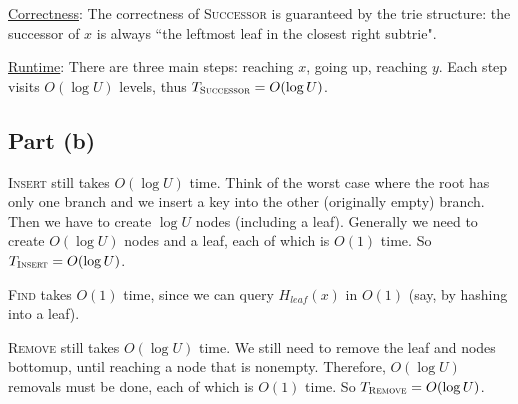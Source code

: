 \documentclass{article}
\begin{document}
\noindent\underline{Correctness}: The correctness of \textsc{Successor} is guaranteed by the trie structure: the successor of $x$ is always ``the leftmost leaf in the closest right subtrie".

\noindent\underline{Runtime}: There are three main steps: reaching $x$, going up, reaching $y$. Each step visits $O(\log U)$ levels, thus $T_{\textsc{Successor}}=O(\log U)$.

\subsection{Part (b)}
\textsc{Insert} still takes $O(\log U)$ time. Think of the worst case where the root has only one branch and we insert a key into the other (originally empty) branch. Then we have to create $\log U$ nodes (including a leaf). Generally we need to create $O(\log U)$ nodes and a leaf, each of which is $O(1)$ time. So $T_{\textsc{Insert}}=O(\log U)$.

\textsc{Find} takes $O(1)$ time, since we can query $H_{leaf}(x)$ in $O(1)$ (say, by hashing into a leaf).

\textsc{Remove} still takes $O(\log U)$ time. We still need to remove the leaf and nodes bottomup, until reaching a node that is nonempty. Therefore, $O(\log U)$ removals must be done, each of which is $O(1)$ time. So $T_{\textsc{Remove}}=O(\log U)$.
\end{document}
